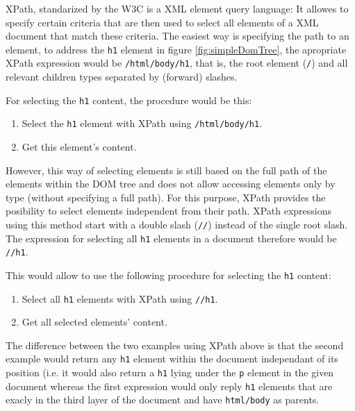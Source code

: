 XPath, standarized by the W3C is a XML element query language: It allowes to specify certain criteria that are then used to select all elements of a XML document that match these criteria. The easiest way is specifying the path to an element, to address the \texttt{h1} element in figure \ref{fig:simpleDomTree}, the apropriate XPath expression would be \verb|/html/body/h1|, that is, the root element (\verb-/-) and all relevant children types separated by (forward) slashes.

For selecting the \texttt{h1} content, the procedure would be this:

\begin{enumerate}
	\item Select the \texttt{h1} element with XPath using \verb|/html/body/h1|.
	\item Get this element's content.
\end{enumerate}

However, this way of selecting elements is still based on the full path of the elements within the DOM tree and does not allow accessing elements only by type (without specifying a full path). For this purpose, XPath provides the posibility to select elements independent from their path. XPath expressions using this method start with a double slash (\verb|//|) instead of the single root slash. The expression for selecting all \texttt{h1} elements in a document therefore would be \verb|//h1|.

This would allow to use the following procedure for selecting the \texttt{h1} content:

\begin{enumerate}
	\item Select all \texttt{h1} elements with XPath using \verb|//h1|.
	\item Get all selected elements' content.
\end{enumerate}

The difference between the two examples using XPath above is that the second example would return any \texttt{h1} element within the document independant of its position (i.e. it would also return a \texttt{h1} lying under the \texttt{p} element in the given document whereas the first expression would only reply \texttt{h1} elements that are exacly in the third layer of the document and have \texttt{html/body} as parents.
